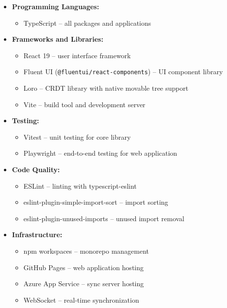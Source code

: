 \documentclass{article}
\begin{document}
\begin{itemize}
\item \textbf{Programming Languages:}
\begin{itemize}
\setlength{\itemsep}{-5pt}
\item TypeScript -- all packages and applications
\end{itemize}

\item \textbf{Frameworks and Libraries:}
\begin{itemize}
\setlength{\itemsep}{-5pt}
\item React 19 -- user interface framework
\item Fluent UI (\texttt{@fluentui/react-components}) -- UI component library
\item Loro -- CRDT library with native movable tree support
\item Vite -- build tool and development server
\end{itemize}

\item \textbf{Testing:}
\begin{itemize}
\setlength{\itemsep}{-5pt}
\item Vitest -- unit testing for core library
\item Playwright -- end-to-end testing for web application
\end{itemize}

\item \textbf{Code Quality:}
\begin{itemize}
\setlength{\itemsep}{-5pt}
\item ESLint -- linting with typescript-eslint
\item eslint-plugin-simple-import-sort -- import sorting
\item eslint-plugin-unused-imports -- unused import removal
\end{itemize}

\item \textbf{Infrastructure:}
\begin{itemize}
\setlength{\itemsep}{-5pt}
\item npm workspaces -- monorepo management
\item GitHub Pages -- web application hosting
\item Azure App Service -- sync server hosting
\item WebSocket -- real-time synchronization
\end{itemize}
\end{itemize}
\end{document}
